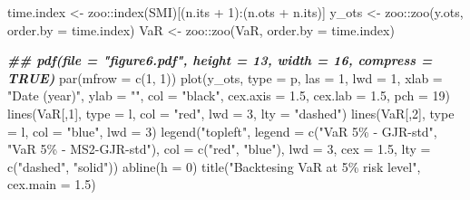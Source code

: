 \documentclass[
]{article}
\newenvironment{Shaded}{\begin{snugshade}}{\end{snugshade}}
\newcommand{\AttributeTok}[1]{\textcolor[rgb]{0.77,0.63,0.00}{#1}}
\newcommand{\DecValTok}[1]{\textcolor[rgb]{0.00,0.00,0.81}{#1}}
\newcommand{\DocumentationTok}[1]{\textcolor[rgb]{0.56,0.35,0.01}{\textbf{\textit{#1}}}}
\newcommand{\FloatTok}[1]{\textcolor[rgb]{0.00,0.00,0.81}{#1}}
\newcommand{\FunctionTok}[1]{\textcolor[rgb]{0.00,0.00,0.00}{#1}}
\newcommand{\NormalTok}[1]{#1}
\newcommand{\OtherTok}[1]{\textcolor[rgb]{0.56,0.35,0.01}{#1}}
\newcommand{\SpecialCharTok}[1]{\textcolor[rgb]{0.00,0.00,0.00}{#1}}
\newcommand{\StringTok}[1]{\textcolor[rgb]{0.31,0.60,0.02}{#1}}
\begin{document}
\begin{Shaded}
\begin{Highlighting}[]
\NormalTok{time.index }\OtherTok{\textless{}{-}}\NormalTok{ zoo}\SpecialCharTok{::}\FunctionTok{index}\NormalTok{(SMI)[(n.its }\SpecialCharTok{+} \DecValTok{1}\NormalTok{)}\SpecialCharTok{:}\NormalTok{(n.ots }\SpecialCharTok{+}\NormalTok{ n.its)]}
\NormalTok{y\_ots }\OtherTok{\textless{}{-}}\NormalTok{ zoo}\SpecialCharTok{::}\FunctionTok{zoo}\NormalTok{(y.ots, }\AttributeTok{order.by =}\NormalTok{ time.index)}
\NormalTok{VaR   }\OtherTok{\textless{}{-}}\NormalTok{ zoo}\SpecialCharTok{::}\FunctionTok{zoo}\NormalTok{(VaR, }\AttributeTok{order.by =}\NormalTok{ time.index)}

\DocumentationTok{\#\# pdf(file = "figure6.pdf", height = 13, width = 16, compress = TRUE)}
\FunctionTok{par}\NormalTok{(}\AttributeTok{mfrow =} \FunctionTok{c}\NormalTok{(}\DecValTok{1}\NormalTok{, }\DecValTok{1}\NormalTok{))}
\FunctionTok{plot}\NormalTok{(y\_ots, }\AttributeTok{type =} \StringTok{\textquotesingle{}p\textquotesingle{}}\NormalTok{, }\AttributeTok{las =} \DecValTok{1}\NormalTok{, }\AttributeTok{lwd =} \DecValTok{1}\NormalTok{, }\AttributeTok{xlab =} \StringTok{"Date (year)"}\NormalTok{,}
     \AttributeTok{ylab =} \StringTok{""}\NormalTok{, }\AttributeTok{col =} \StringTok{"black"}\NormalTok{, }\AttributeTok{cex.axis =} \FloatTok{1.5}\NormalTok{, }\AttributeTok{cex.lab =} \FloatTok{1.5}\NormalTok{, }\AttributeTok{pch =} \DecValTok{19}\NormalTok{)}
\FunctionTok{lines}\NormalTok{(VaR[,}\DecValTok{1}\NormalTok{], }\AttributeTok{type =} \StringTok{\textquotesingle{}l\textquotesingle{}}\NormalTok{, }\AttributeTok{col =} \StringTok{"red"}\NormalTok{, }\AttributeTok{lwd =} \DecValTok{3}\NormalTok{, }\AttributeTok{lty =} \StringTok{"dashed"}\NormalTok{)}
\FunctionTok{lines}\NormalTok{(VaR[,}\DecValTok{2}\NormalTok{], }\AttributeTok{type =} \StringTok{\textquotesingle{}l\textquotesingle{}}\NormalTok{, }\AttributeTok{col =} \StringTok{"blue"}\NormalTok{, }\AttributeTok{lwd =} \DecValTok{3}\NormalTok{)}
\FunctionTok{legend}\NormalTok{(}\StringTok{"topleft"}\NormalTok{, }\AttributeTok{legend =} \FunctionTok{c}\NormalTok{(}\StringTok{"VaR 5\% {-} GJR{-}std"}\NormalTok{, }\StringTok{"VaR 5\% {-} MS2{-}GJR{-}std"}\NormalTok{),}
       \AttributeTok{col =} \FunctionTok{c}\NormalTok{(}\StringTok{"red"}\NormalTok{, }\StringTok{"blue"}\NormalTok{), }\AttributeTok{lwd =} \DecValTok{3}\NormalTok{, }\AttributeTok{cex =} \FloatTok{1.5}\NormalTok{, }\AttributeTok{lty =} \FunctionTok{c}\NormalTok{(}\StringTok{"dashed"}\NormalTok{, }\StringTok{"solid"}\NormalTok{))}
\FunctionTok{abline}\NormalTok{(}\AttributeTok{h =} \DecValTok{0}\NormalTok{)}
\FunctionTok{title}\NormalTok{(}\StringTok{"Backtesing VaR at 5\% risk level"}\NormalTok{, }\AttributeTok{cex.main =} \FloatTok{1.5}\NormalTok{)}
\end{Highlighting}
\end{Shaded}
\end{document}
